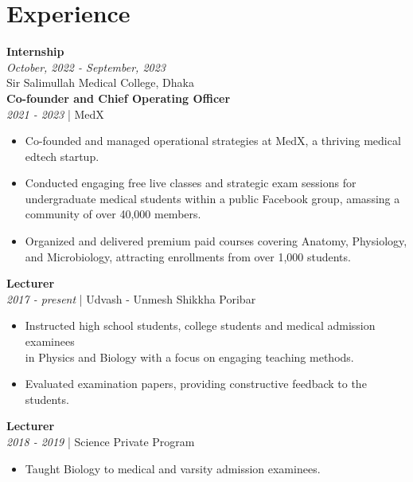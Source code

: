 \documentclass[a4paper,11pt]{article}
\newcommand{\resumeentry}[2]{
    \textbf{#1} \\
    \textit{#2}
}
\begin{document}
\begin{minipage}[t][6cm]{0.98\textwidth}
\section*{Experience}
\resumeentry{Internship}{October, 2022 - September, 2023}\\ Sir Salimullah Medical College, Dhaka \vspace{0.2cm} \\
\resumeentry{Co-founder and Chief Operating Officer}{2021 - 2023} | MedX
\begin{itemize}[left=0em, itemsep=0pt, parsep=0pt]
  \item Co-founded and managed operational strategies at MedX, a thriving medical edtech startup.
  \item Conducted engaging free live classes and strategic exam sessions for undergraduate medical students within a public Facebook group, amassing a community of over 40,000 members.
  \item Organized and delivered premium paid courses covering Anatomy, Physiology, and Microbiology, attracting enrollments from over 1,000 students.
\end{itemize}
\resumeentry{Lecturer}{2017 - present} | Udvash - Unmesh Shikkha Poribar
\begin{itemize}[left=0em, itemsep=10pt, parsep=-10pt]
  \item Instructed high school students, college students and medical admission examinees \\ 
    in Physics and Biology with a focus on engaging teaching methods.
  \item Evaluated examination papers, providing constructive feedback to the students.
\end{itemize}
\resumeentry{Lecturer}{2018 - 2019} | Science Private Program
\begin{itemize}[left=0em, itemsep=0pt, parsep=-10pt]
  \item Taught Biology to medical and varsity admission examinees.
\end{itemize}
\end{minipage}
\end{document}
